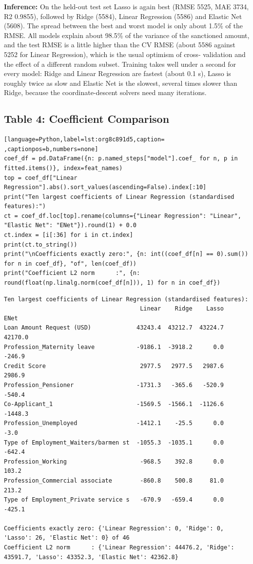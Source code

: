 \documentclass[11pt]{article}
\begin{document}
\textbf{Inference:} On the held-out test set Lasso is again best (RMSE 5525, MAE 3734, R2 0.9855), followed by
Ridge (5584), Linear Regression (5586) and Elastic Net (5608). The spread between the best
and worst model is only about 1.5\% of the RMSE. All models explain about 98.5\% of the
variance of the sanctioned amount, and the test RMSE is a little higher than the CV RMSE
(about 5586 against 5252 for Linear Regression), which is the usual optimism of cross-
validation and the effect of a different random subset. Training takes well under a second
for every model: Ridge and Linear Regression are fastest (about 0.1 s), Lasso is roughly
twice as slow and Elastic Net is the slowest, several times slower than Ridge, because the
coordinate-descent solvers need many iterations.

\subsection*{Table 4: Coefficient Comparison}
\label{sec:org3dcf43b}

\begin{lstlisting}[language=Python,label=lst:org8c891d5,caption= ,captionpos=b,numbers=none]
coef_df = pd.DataFrame({n: p.named_steps["model"].coef_ for n, p in fitted.items()}, index=feat_names)
top = coef_df["Linear Regression"].abs().sort_values(ascending=False).index[:10]
print("Ten largest coefficients of Linear Regression (standardised features):")
ct = coef_df.loc[top].rename(columns={"Linear Regression": "Linear", "Elastic Net": "ENet"}).round(1) + 0.0
ct.index = [i[:36] for i in ct.index]
print(ct.to_string())
print("\nCoefficients exactly zero:", {n: int((coef_df[n] == 0).sum()) for n in coef_df}, "of", len(coef_df))
print("Coefficient L2 norm      :", {n: round(float(np.linalg.norm(coef_df[n])), 1) for n in coef_df})
\end{lstlisting}

\begin{verbatim}
Ten largest coefficients of Linear Regression (standardised features):
                                       Linear    Ridge    Lasso     ENet
Loan Amount Request (USD)             43243.4  43212.7  43224.7  42170.0
Profession_Maternity leave            -9186.1  -3918.2      0.0   -246.9
Credit Score                           2977.5   2977.5   2987.6   2986.9
Profession_Pensioner                  -1731.3   -365.6   -520.9   -540.4
Co-Applicant_1                        -1569.5  -1566.1  -1126.6  -1448.3
Profession_Unemployed                 -1412.1    -25.5      0.0     -3.0
Type of Employment_Waiters/barmen st  -1055.3  -1035.1      0.0   -642.4
Profession_Working                     -968.5    392.8      0.0    103.2
Profession_Commercial associate        -860.8    500.8     81.0    213.2
Type of Employment_Private service s   -670.9   -659.4      0.0   -425.1

Coefficients exactly zero: {'Linear Regression': 0, 'Ridge': 0, 'Lasso': 26, 'Elastic Net': 0} of 46
Coefficient L2 norm      : {'Linear Regression': 44476.2, 'Ridge': 43591.7, 'Lasso': 43352.3, 'Elastic Net': 42362.8}
\end{verbatim}
\end{document}
